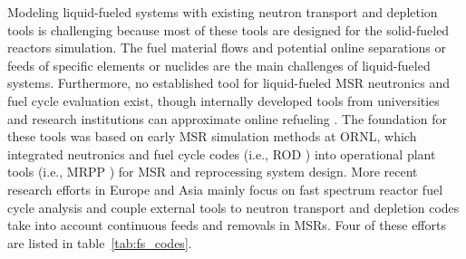 Modeling liquid-fueled systems with existing neutron transport and depletion 
tools is challenging because most of these tools are designed for the 
solid-fueled reactors simulation. The fuel material flows and potential online 
separations or feeds of specific elements or nuclides are the main challenges
of liquid-fueled systems. Furthermore, no established tool for liquid-fueled 
\gls{MSR} neutronics and fuel cycle evaluation exist, though internally 
developed tools from universities and research institutions can approximate 
online refueling \cite{serp_molten_2014}. The foundation for these tools was 
based on early \gls{MSR} simulation methods at \gls{ORNL}, which integrated 
neutronics and fuel cycle codes (i.e., ROD \cite{bauman_rod:_1971}) into 
operational plant tools (i.e., MRPP \cite{kee_mrpp:_1976}) for \gls{MSR} and 
reprocessing system design. More recent research efforts in Europe and Asia 
mainly focus on fast spectrum reactor fuel cycle analysis and couple external 
tools to neutron transport and depletion codes take into account continuous 
feeds and removals in \glspl{MSR}. Four of these efforts are listed in 
table~\ref{tab:fs_codes}.


